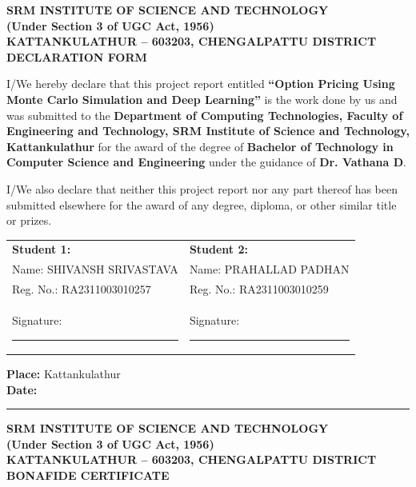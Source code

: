 \documentclass[12pt,a4paper]{report}
\begin{document}
\newpage
\thispagestyle{empty}
\begin{center}
\textbf{\Large SRM INSTITUTE OF SCIENCE AND TECHNOLOGY}\\
\textbf{(Under Section 3 of UGC Act, 1956)}\\[0.3cm]
\textbf{KATTANKULATHUR -- 603203, CHENGALPATTU DISTRICT}\\[1cm]

\textbf{\Large DECLARATION FORM}
\end{center}

\vspace{1cm}

I/We hereby declare that this project report entitled \textbf{``Option Pricing Using Monte Carlo Simulation and Deep Learning''} is the work done by us and was submitted to the \textbf{Department of Computing Technologies, Faculty of Engineering and Technology, SRM Institute of Science and Technology, Kattankulathur} for the award of the degree of \textbf{Bachelor of Technology in Computer Science and Engineering} under the guidance of \textbf{Dr. Vathana D}.

\vspace{0.5cm}

I/We also declare that neither this project report nor any part thereof has been submitted elsewhere for the award of any degree, diploma, or other similar title or prizes.

\vspace{2cm}

\noindent
\begin{tabular}{p{7cm}p{7cm}}
\textbf{Student 1:} & \textbf{Student 2:} \\[0.5cm]
Name: SHIVANSH SRIVASTAVA & Name: PRAHALLAD PADHAN \\
Reg. No.: RA2311003010257 & Reg. No.: RA2311003010259 \\[1.5cm]
Signature: \rule{4cm}{0.4pt} & Signature: \rule{4cm}{0.4pt} \\
\end{tabular}

\vspace{2cm}

\noindent
\textbf{Place:} Kattankulathur\\
\textbf{Date:} \rule{4cm}{0.4pt}

\newpage
\thispagestyle{empty}
\begin{center}
\textbf{\Large SRM INSTITUTE OF SCIENCE AND TECHNOLOGY}\\
\textbf{(Under Section 3 of UGC Act, 1956)}\\[0.3cm]
\textbf{KATTANKULATHUR -- 603203, CHENGALPATTU DISTRICT}\\[1cm]

\textbf{\Large BONAFIDE CERTIFICATE}
\end{center}
\end{document}
